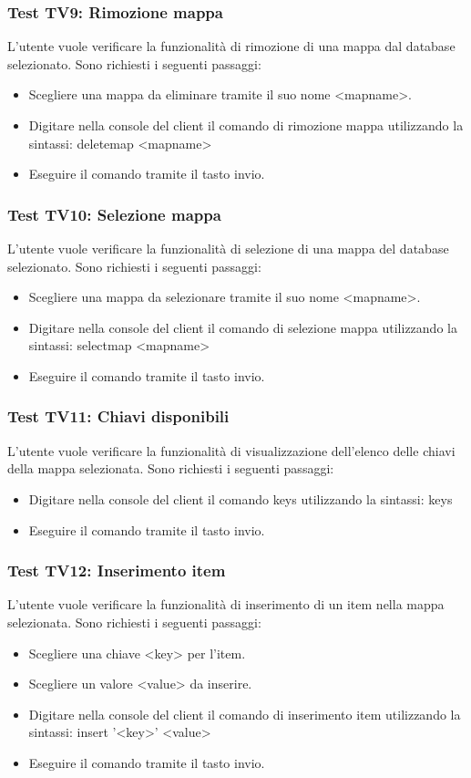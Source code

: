 \documentclass[a4paper]{article}
\begin{document}
		\subsubsection{Test TV9: Rimozione mappa}
		L'utente vuole verificare la funzionalità di rimozione di una mappa dal database selezionato.
		Sono richiesti i seguenti passaggi:
		\begin{itemize}
			\item Scegliere una mappa da eliminare tramite il suo nome <mapname>.
			\item Digitare nella console del client il comando di rimozione mappa utilizzando la sintassi: deletemap <mapname>
			\item Eseguire il comando tramite il tasto invio.
		\end{itemize}
		
		\subsubsection{Test TV10: Selezione mappa}
		L'utente vuole verificare la funzionalità di selezione di una mappa del database selezionato.
		Sono richiesti i seguenti passaggi:
		\begin{itemize}
			\item Scegliere una mappa da selezionare tramite il suo nome <mapname>.
			\item Digitare nella console del client il comando di selezione mappa utilizzando la sintassi: selectmap <mapname>
			\item Eseguire il comando tramite il tasto invio.
		\end{itemize}
		
		\subsubsection{Test TV11: Chiavi disponibili}
		L'utente vuole verificare la funzionalità di visualizzazione dell'elenco delle chiavi della mappa selezionata.
		Sono richiesti i seguenti passaggi:
		\begin{itemize}
			\item Digitare nella console del client il comando keys utilizzando la sintassi: keys
			\item Eseguire il comando tramite il tasto invio.
		\end{itemize}
		
		\subsubsection{Test TV12: Inserimento item}
		L'utente vuole verificare la funzionalità di inserimento di un item nella mappa selezionata.
		Sono richiesti i seguenti passaggi:
		\begin{itemize}
			\item Scegliere una chiave <key> per l'item.
			\item Scegliere un valore <value> da inserire.
			\item Digitare nella console del client il comando di inserimento item utilizzando la sintassi: insert '<key>' <value>
			\item Eseguire il comando tramite il tasto invio.
		\end{itemize}
		
\end{document}
